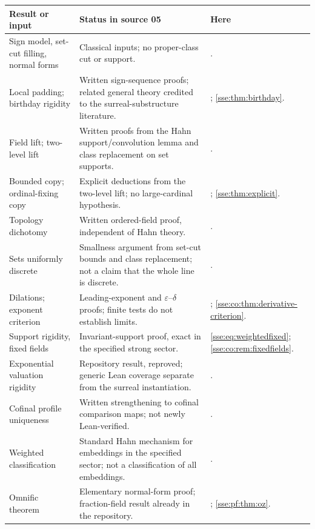 \documentclass[11pt,a4paper]{article}
\numberwithin{equation}{section}
\theoremstyle{plain}
\theoremstyle{definition}
\theoremstyle{remark}
\begin{document}
\begingroup\small
\begin{longtable}{P{40mm}P{62mm}P{48mm}}
\toprule
Result or input & Status in source 05 & Here \\
\midrule
\endhead
Sign model, set-cut filling, normal forms & Classical inputs; no proper-class cut or support. & . \\
Local padding; birthday rigidity & Written sign-sequence proofs; related general theory credited to the surreal-substructure literature. & ; \cref{sse:thm:birthday}. \\
Field lift; two-level lift & Written proofs from the Hahn support/convolution lemma and class replacement on set supports. & . \\
Bounded copy; ordinal-fixing copy & Explicit deductions from the two-level lift; no large-cardinal hypothesis. & ; \cref{sse:thm:explicit}. \\
Topology dichotomy & Written ordered-field proof, independent of Hahn theory. & . \\
Sets uniformly discrete & Smallness argument from set-cut bounds and class replacement; not a claim that the whole line is discrete. & . \\
Dilations; exponent criterion & Leading-exponent and $\varepsilon$--$\delta$ proofs; finite tests do not establish limits. & ; \cref{sse:co:thm:derivative-criterion}. \\
Support rigidity, fixed fields & Invariant-support proof, exact in the specified strong sector. & \eqref{sse:eq:weightedfixed}; \cref{sse:co:rem:fixedfields}. \\
Exponential valuation rigidity & Repository result, reproved; generic Lean coverage separate from the surreal instantiation. & . \\
Cofinal profile uniqueness & Written strengthening to cofinal comparison maps; not newly Lean-verified. & . \\
Weighted classification & Standard Hahn mechanism for embeddings in the specified sector; not a classification of all embeddings. & . \\
Omnific theorem & Elementary normal-form proof; fraction-field result already in the repository. & ; \cref{sse:pf:thm:oz}. \\

\end{longtable}
\end{document}
